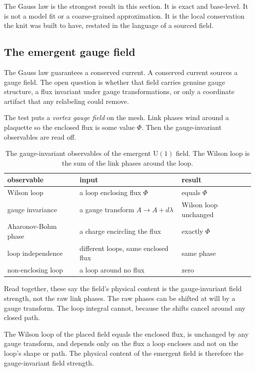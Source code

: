 The Gauss law is the strongest result in this section. It is exact and base-level. It is not a model fit or a coarse-grained approximation. It is the local conservation the knit was built to have, restated in the language of a sourced field.

\subsection{The emergent gauge field}

The Gauss law guarantees a conserved current. A conserved current sources a gauge field. The open question is whether that field carries genuine gauge structure, a flux invariant under gauge transformations, or only a coordinate artifact that any relabeling could remove.

The test puts a \emph{vortex gauge field} on the mesh. Link phases wind around a plaquette so the enclosed flux is some value $\Phi$. Then the gauge-invariant observables are read off.

\begin{table}[ht]
\centering
\begin{tabular}{@{}lll@{}}
\toprule
observable & input & result \\
\midrule
Wilson loop & a loop enclosing flux $\Phi$ & equals $\Phi$ \\
gauge invariance & a gauge transform $A \to A + d\lambda$ & Wilson loop unchanged \\
Aharonov-Bohm phase & a charge encircling the flux & exactly $\Phi$ \\
loop independence & different loops, same enclosed flux & same phase \\
non-enclosing loop & a loop around no flux & zero \\
\bottomrule
\end{tabular}
\caption{The gauge-invariant observables of the emergent $\mathrm{U}(1)$ field. The Wilson loop is the sum of the link phases around the loop.}
\label{tab:em-wilson}
\end{table}

Read together, these say the field's physical content is the gauge-invariant field strength, not the raw link phases. The raw phases can be shifted at will by a gauge transform. The loop integral cannot, because the shifts cancel around any closed path.

\begin{result}
The Wilson loop of the placed field equals the enclosed flux, is unchanged by any gauge transform, and depends only on the flux a loop encloses and not on the loop's shape or path. The physical content of the emergent field is therefore the gauge-invariant field strength.
\end{result}

